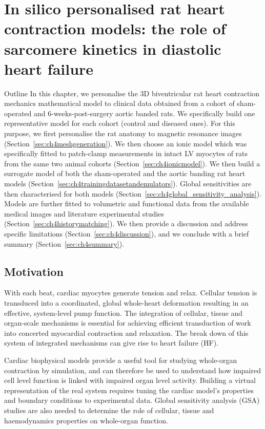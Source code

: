 \chapter{In silico personalised rat heart contraction models: the role of sarcomere kinetics in diastolic heart failure}\label{cha:chapter4}
%
%
%
\begin{remark}{Outline}
    In this chapter, we personalise the $3$D biventricular rat heart contraction mechanics mathematical model to clinical data obtained from a cohort of sham-operated and $6$-weeks-post-surgery aortic banded rats. We specifically build one representative model for each cohort (control and diseased ones). For this purpose, we first personalise the rat anatomy to magnetic resonance images (Section~\ref{sec:ch4meshgeneration}). We then choose an ionic model which was specifically fitted to patch-clamp measurements in intact LV myocytes of rats from the same two animal cohorts (Section~\ref{sec:ch4ionicmodel}). We then build a surrogate model of both the sham-operated and the aortic banding rat heart models (Section~\ref{sec:ch4trainingdatasetandemulators}). Global sensitivities are then characterised for both models (Section~\ref{sec:ch4global_sensitivity_analysis}). Models are further fitted to volumetric and functional data from the available medical images and literature experimental studies (Section~\ref{sec:ch4historymatching}). We then provide a discussion and address specific limitations (Section~\ref{sec:ch4discussion}), and we conclude with a brief summary (Section~\ref{sec:ch4summary}).
\end{remark}


%
%
%
\section{Motivation}\label{sec:ch4motivation}
With each beat, cardiac myocytes generate tension and relax. Cellular tension is transduced into a coordinated, global whole-heart deformation resulting in an effective, system-level pump function. The integration of cellular, tissue and organ-scale mechanisms is essential for achieving efficient transduction of work into concerted myocardial contraction and relaxation. The break down of this system of integrated mechanisms can give rise to heart failure (HF). 

\vspace{0.2cm}
Cardiac biophysical models provide a useful tool for studying whole-organ contraction \cite{Niederer:2019} by simulation, and can therefore be used to understand how impaired cell level function is linked with impaired organ level activity. Building a virtual representation of the real system requires tuning the cardiac model's properties and boundary conditions to experimental data. Global sensitivity analysis (GSA) studies are also needed to determine the role of cellular, tissue and haemodynamics properties on whole-organ function.

